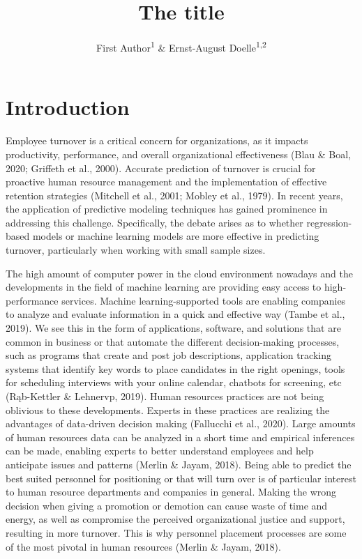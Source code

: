 \documentclass[
  man]{apa6}
\title{The title}
\author{First Author\textsuperscript{1} \& Ernst-August Doelle\textsuperscript{1,2}}
\date{}
\affiliation{\vspace{0.5cm}\textsuperscript{1} Wilhelm-Wundt-University\\\textsuperscript{2} Konstanz Business School}
\begin{document}
\maketitle

\hypertarget{introduction}{%
\section{Introduction}\label{introduction}}

Employee turnover is a critical concern for organizations, as it impacts productivity, performance, and overall organizational effectiveness (Blau \& Boal, 2020; Griffeth et al., 2000). Accurate prediction of turnover is crucial for proactive human resource management and the implementation of effective retention strategies (Mitchell et al., 2001; Mobley et al., 1979). In recent years, the application of predictive modeling techniques has gained prominence in addressing this challenge. Specifically, the debate arises as to whether regression-based models or machine learning models are more effective in predicting turnover, particularly when working with small sample sizes.

The high amount of computer power in the cloud environment nowadays and the developments in the field of machine learning are providing easy access to high-performance services. Machine learning-supported tools are enabling companies to analyze and evaluate information in a quick and effective way (Tambe et al., 2019). We see this in the form of applications, software, and solutions that are common in business or that automate the different decision-making processes, such as programs that create and post job descriptions, application tracking systems that identify key words to place candidates in the right openings, tools for scheduling interviews with your online calendar, chatbots for screening, etc (Rąb-Kettler \& Lehnervp, 2019).
Human resources practices are not being oblivious to these developments. Experts in these practices are realizing the advantages of data-driven decision making (Fallucchi et al., 2020). Large amounts of human resources data can be analyzed in a short time and empirical inferences can be made, enabling experts to better understand employees and help anticipate issues and patterns (Merlin \& Jayam, 2018). Being able to predict the best suited personnel for positioning or that will turn over is of particular interest to human resource departments and companies in general. Making the wrong decision when giving a promotion or demotion can cause waste of time and energy, as well as compromise the perceived organizational justice and support, resulting in more turnover. This is why personnel placement processes are some of the most pivotal in human resources (Merlin \& Jayam, 2018).
\end{document}
